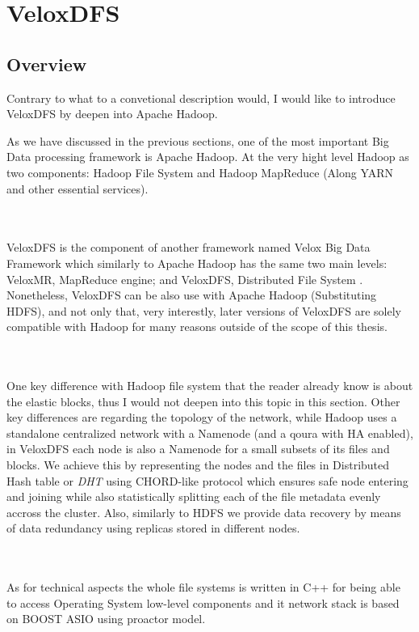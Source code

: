 \section{VeloxDFS}
\subsection{Overview}
Contrary to what to a convetional description would, I would like to introduce
VeloxDFS by deepen into Apache Hadoop.

As we have discussed in the previous sections, one of the most important Big
Data processing framework is Apache Hadoop.  At the very hight level Hadoop as
two components: Hadoop File System and Hadoop MapReduce (Along YARN and other
essential services).

\\ \\ 

VeloxDFS is the component of another framework named Velox Big Data Framework
which similarly to Apache Hadoop has the same two main levels: VeloxMR,
MapReduce engine; and VeloxDFS, Distributed File System .  Nonetheless,
VeloxDFS can be also use with Apache Hadoop (Substituting HDFS), and not only
that, very interestly, later versions of VeloxDFS are solely compatible with
Hadoop for many reasons outside of the scope of this thesis.

\\ \\ 

One key difference with Hadoop file system that the reader already know is
about the elastic blocks, thus I would not deepen into this topic in this
section. Other key differences are regarding the topology of the network, while
Hadoop uses a standalone centralized network with a Namenode (and a qoura with
HA enabled), in  VeloxDFS each node is also a Namenode for a small subsets of
its files and blocks. We achieve this by representing the nodes and the files
in Distributed Hash table or \textit{DHT} using CHORD-like protocol which ensures
safe node entering and joining while also statistically splitting each of the
file metadata evenly accross the cluster. Also, similarly to HDFS we provide 
data recovery by means of data redundancy using replicas stored in different nodes.

\\ \\

As for technical aspects the whole file systems is written in C++ for being
able to access Operating System low-level components and it network stack is
based on BOOST ASIO using proactor model.

